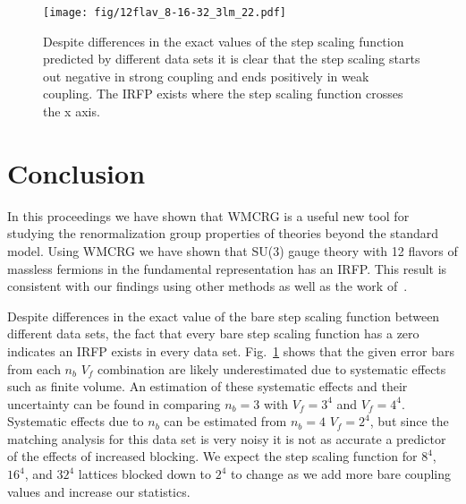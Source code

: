 \documentclass{PoS}
\newcommand{\fig}[1]{Fig.~\ref{#1}}
\newcommand{\TODO}[1]{\textcolor{red}{{\bf #1}}}
\begin{document}
\begin{figure}[th]
  \centering
  \texttt{[image: fig/12flav\_8-16-32\_3lm\_22.pdf]}
  \caption{Despite differences in the exact values of the step scaling function predicted by different data sets it is clear that the step scaling starts out negative in strong coupling and ends positively in weak coupling.  The IRFP exists where the step scaling function crosses the x axis.}
  \label{fig:scheme7}
\end{figure}



\section{Conclusion}
In this proceedings we have shown that WMCRG is a useful new tool for studying the renormalization group properties of theories beyond the standard model.
Using WMCRG we have shown that SU(3) gauge theory with 12 flavors of massless fermions in the fundamental representation has an IRFP.
This result is consistent with our findings using other methods as well as the work of~\TODO{\cite{}}.

Despite differences in the exact value of the bare step scaling function between different data sets, the fact that every bare step scaling function has a zero indicates an IRFP exists in every data set.
\fig{fig:scheme7} shows that the given error bars from each $n_b$ $V_f$ combination are likely underestimated due to systematic effects such as finite volume.
An estimation of these systematic effects and their uncertainty can be found in comparing $n_b = 3$ with $V_f = 3^4$ and $V_f = 4^4$.
Systematic effects due to $n_b$ can be estimated from $n_b = 4$ $V_f = 2^4$, but since the matching analysis for this data set is very noisy it is not as accurate a predictor of the effects of increased blocking.
We expect the step scaling function for $8^4$, $16^4$, and $32^4$ lattices blocked down to $2^4$ to change as we add more bare coupling values and increase our statistics.



\end{document}
